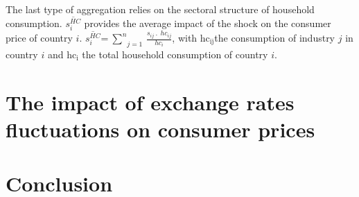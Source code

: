 \documentclass[11pt,a4paper]{article}
\begin{document}
The last type of aggregation relies on the sectoral structure of household consumption. $\overline{s_{i}^{HC}}$ provides the average impact of the shock on the consumer price of country $i$. 
$\overline{s_{i}^{HC}}$=$~\underset{j=1}{\overset{n}{\mathop \sum }}\,\frac{{{s}_{ij}}~.~~h{{c}_{ij}}}{h{{c}_{i}}}$, 
with $\text{h}{{\text{c}}_{\text{ij}}}$the consumption of industry $j$ in country $i$ and $\text{h}{{\text{c}}_{\text{i}}}$ the total household consumption of country $i$. 

\section{The impact of exchange rates fluctuations on consumer prices}
\label{sec:prixconso}


\section{Conclusion}
\label{sec:ccl}


\newpage

\end{document}
